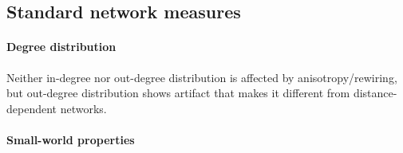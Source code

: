 \subsection*{Standard network measures}

\paragraph{Degree distribution} Neither in-degree nor out-degree
distribution is affected by anisotropy/rewiring, but out-degree
distribution shows artifact that makes it different from
distance-dependent networks.

\paragraph{Small-world properties} 
